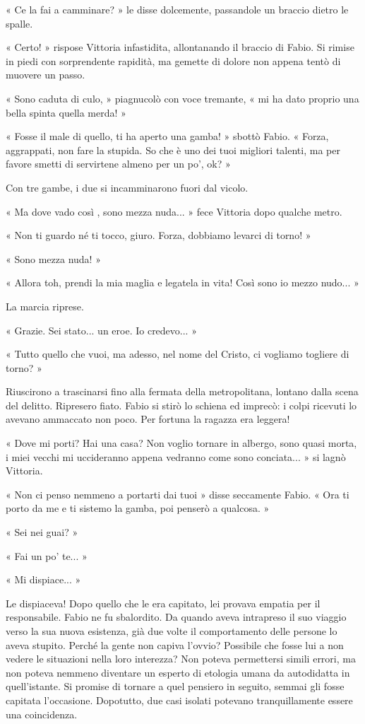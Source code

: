 « Ce la fai a camminare? » le disse dolcemente, passandole un braccio dietro le spalle.

« Certo! » rispose Vittoria infastidita, allontanando il braccio di Fabio. Si rimise in piedi con sorprendente rapidità, ma gemette di dolore non appena tentò di muovere un passo.

« Sono caduta di culo, » piagnucolò con voce tremante, « mi ha dato proprio una bella spinta quella merda! »

« Fosse il male di quello, ti ha aperto una gamba! » sbottò Fabio. « Forza, aggrappati, non fare la stupida. So che è uno dei tuoi migliori talenti, ma per favore smetti di servirtene almeno per un po', ok?  »

Con tre gambe, i due si incamminarono fuori dal vicolo.

« Ma dove vado così , sono mezza nuda... » fece Vittoria dopo qualche metro.

« Non ti guardo né ti tocco, giuro. Forza, dobbiamo levarci di torno! »

« Sono mezza nuda! »

« Allora toh, prendi la mia maglia e legatela in vita! Così sono io mezzo nudo... »

La marcia riprese.

« Grazie. Sei stato... un eroe. Io credevo... »

« Tutto quello che vuoi, ma adesso, nel nome del Cristo, ci vogliamo togliere di torno? »

Riuscirono a trascinarsi fino alla fermata della metropolitana, lontano dalla scena del delitto. Ripresero fiato. Fabio si stirò lo schiena ed imprecò: i colpi ricevuti lo avevano ammaccato non poco. Per fortuna la ragazza era leggera!

« Dove mi porti? Hai una casa? Non voglio tornare in albergo, sono quasi morta, i miei vecchi mi uccideranno appena vedranno come sono conciata... » si lagnò Vittoria.

« Non ci penso nemmeno a portarti dai tuoi » disse seccamente Fabio. « Ora ti porto da me e ti sistemo la gamba, poi penserò a qualcosa. »

« Sei nei guai? »

« Fai un po' te... »

« Mi dispiace... »

Le dispiaceva! Dopo quello che le era capitato, lei provava empatia per il responsabile. Fabio ne fu sbalordito. Da quando aveva intrapreso il suo viaggio verso la sua nuova esistenza, già due volte il comportamento delle persone lo aveva stupito. Perché la gente non capiva l'ovvio? Possibile che fosse lui a non vedere le situazioni nella loro interezza? Non poteva permettersi simili errori, ma non poteva nemmeno diventare un esperto di etologia umana da autodidatta in quell'istante. Si promise di tornare a quel pensiero in seguito, semmai gli fosse capitata l'occasione. Dopotutto, due casi isolati potevano tranquillamente essere una coincidenza.

